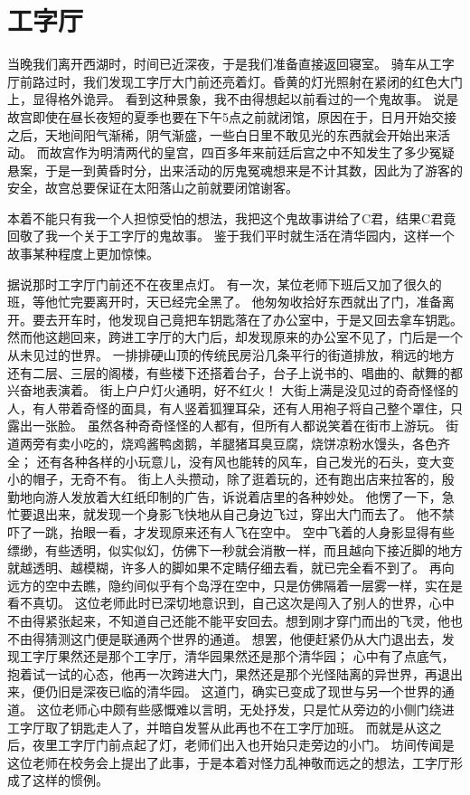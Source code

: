 \chapter{工字厅}

当晚我们离开西湖时，时间已近深夜，于是我们准备直接返回寝室。
骑车从工字厅前路过时，我们发现工字厅大门前还亮着灯。昏黄的灯光照射在紧闭的红色大门上，显得格外诡异。
看到这种景象，我不由得想起以前看过的一个鬼故事。
说是故宫即使在昼长夜短的夏季也要在下午5点之前就闭馆，原因在于，日月开始交接之后，天地间阳气渐稀，阴气渐盛，一些白日里不敢见光的东西就会开始出来活动。
而故宫作为明清两代的皇宫，四百多年来前廷后宫之中不知发生了多少冤疑悬案，于是一到黄昏时分，出来活动的厉鬼冤魂想来是不计其数，因此为了游客的安全，故宫总要保证在太阳落山之前就要闭馆谢客。

本着不能只有我一个人担惊受怕的想法，我把这个鬼故事讲给了C君，结果C君竟回敬了我一个关于工字厅的鬼故事。
鉴于我们平时就生活在清华园内，这样一个故事某种程度上更加惊悚。

据说那时工字厅门前还不在夜里点灯。
有一次，某位老师下班后又加了很久的班，等他忙完要离开时，天已经完全黑了。
他匆匆收拾好东西就出了门，准备离开。要去开车时，他发现自己竟把车钥匙落在了办公室中，于是又回去拿车钥匙。
然而他这趟回来，跨进工字厅的大门后，却发现原来的办公室不见了，门后是一个从未见过的世界。
一排排硬山顶的传统民房沿几条平行的街道排放，稍远的地方还有二层、三层的阁楼，有些楼下还搭着台子，台子上说书的、唱曲的、献舞的都兴奋地表演着。
街上户户灯火通明，好不红火！
大街上满是没见过的奇奇怪怪的人，有人带着奇怪的面具，有人竖着狐狸耳朵，还有人用袍子将自己整个罩住，只露出一张脸。
虽然各种奇奇怪怪的人都有，但所有人都说笑着在街市上游玩。
街道两旁有卖小吃的，烧鸡酱鸭卤鹅，羊腿猪耳臭豆腐，烧饼凉粉水馒头，各色齐全；
还有各种各样的小玩意儿，没有风也能转的风车，自己发光的石头，变大变小的帽子，无奇不有。
街上人头攒动，除了逛着玩的，还有跑出店来拉客的，殷勤地向游人发放着大红纸印制的广告，诉说着店里的各种妙处。
他愣了一下，急忙要退出来，就发现一个身影飞快地从自己身边飞过，穿出大门而去了。
他不禁吓了一跳，抬眼一看，才发现原来还有人飞在空中。
空中飞着的人身影显得有些缥缈，有些透明，似实似幻，仿佛下一秒就会消散一样，而且越向下接近脚的地方就越透明、越模糊，许多人的脚如果不定睛仔细去看，就已完全看不到了。
再向远方的空中去瞧，隐约间似乎有个岛浮在空中，只是仿佛隔着一层雾一样，实在是看不真切。
这位老师此时已深切地意识到，自己这次是闯入了别人的世界，心中不由得紧张起来，不知道自己还能不能平安回去。想到刚才穿门而出的飞灵，他也不由得猜测这门便是联通两个世界的通道。
想罢，他便赶紧仍从大门退出去，发现工字厅果然还是那个工字厅，清华园果然还是那个清华园；
心中有了点底气，抱着试一试的心态，他再一次跨进大门，果然还是那个光怪陆离的异世界，再退出来，便仍旧是深夜已临的清华园。
这道门，确实已变成了现世与另一个世界的通道。
这位老师心中颇有些感慨难以言明，无处抒发，只是忙从旁边的小侧门绕进工字厅取了钥匙走人了，并暗自发誓从此再也不在工字厅加班。
而就是从这之后，夜里工字厅门前点起了灯，老师们出入也开始只走旁边的小门。
坊间传闻是这位老师在校务会上提出了此事，于是本着对怪力乱神敬而远之的想法，工字厅形成了这样的惯例。

